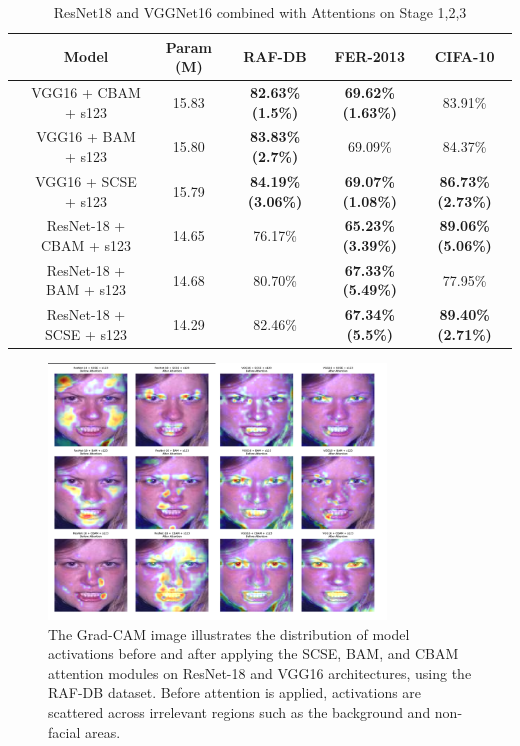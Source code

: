 \documentclass[pdflatex,sn-mathphys-num]{sn-jnl}%
\theoremstyle{thmstyleone}%
\theoremstyle{thmstyletwo}%
\theoremstyle{thmstylethree}%
\begin{document}
\begin{table}[ht]
    \centering
    \caption{ResNet18 and VGGNet16 combined with Attentions on Stage 1,2,3}
    \label{tab3}
    \begin{tabular}{|c|c|c|c|c|c|}
    \hline
    \textbf{} & \textbf{Model} & \textbf{Param (M)} & \textbf{RAF-DB} & \textbf{FER-2013}  & \textbf{CIFA-10}\\
    \hline
    & VGG16 + CBAM + s123 & 15.83 & \textbf{82.63\%(1.5\%)} & \textbf{69.62\%(1.63\%)} & 83.91\% \\
    & VGG16 + BAM + s123 & 15.80 & \textbf{83.83\%(2.7\%)} & 69.09\% & 84.37\% \\
    & VGG16 + SCSE + s123 & 15.79 & \textbf{84.19\%(3.06\%) }& \textbf{69.07\%(1.08\%)} & \textbf{86.73\%(2.73\%)} \\
    & ResNet-18 + CBAM + s123 & 14.65 & 76.17\% & \textbf{65.23\%(3.39\%)} & \textbf{89.06\%(5.06\%)} \\
    & ResNet-18 + BAM + s123 & 14.68 & 80.70\% & \textbf{67.33\%(5.49\%)} & 77.95\% \\
    & ResNet-18 + SCSE + s123 & 14.29 & 82.46\% & \textbf{67.34\%(5.5\%) }& \textbf{89.40\%(2.71\%)} \\
    \hline
    \end{tabular}
\end{table}

\newpages

\begin{figure}[h]
\centering
\includegraphics[width=0.8\textwidth]{Figures/grad-cam.png}
\caption{
The Grad-CAM image illustrates the distribution of model activations before and after applying the SCSE, BAM, and CBAM attention modules on ResNet-18 and VGG16 architectures, using the RAF-DB dataset. Before attention is applied, activations are scattered across irrelevant regions such as the background and non-facial areas.
}
\label{fig:gradcam}
\end{figure}
\end{document}

